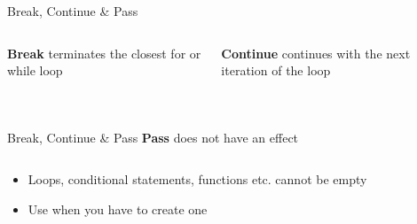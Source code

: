         \begin{frame}{Break, Continue \& Pass}
            \begin{columns}
                \begin{column}{0.5\textwidth}
                    \textbf{Break}
                    terminates the closest for or while loop
                    \bigskip  
                    \inputminted[frame=single,framesep=2pt]{python3}{code-examples/break1.py}
                    \pause
                    \inputminted[frame=single,framesep=2pt]{python3}{code-examples/break2.py}
                \end{column}
               \pause 
                \begin{column}{0.5\textwidth}
                    \textbf{Continue}
                    continues with the next iteration of the loop
                    \bigskip  
                    \inputminted[frame=single,framesep=2pt]{python3}{code-examples/continue1.py}
                    \pause
                    \inputminted[frame=single,framesep=2pt]{python3}{code-examples/continue2.py}
                \end{column} 
            \end{columns}
        \end{frame}
        
        \begin{frame}{Break, Continue \& Pass}
            \textbf{Pass}
            does not have an effect
            \bigskip  
            \inputminted[frame=single,framesep=2pt]{python3}{code-examples/pass.py}
            \begin{itemize}
                \item Loops, conditional statements, functions etc. cannot be empty 
                \item Use when you have to create one
            \end{itemize}
        \end{frame}


